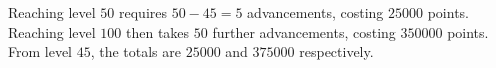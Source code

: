 Reaching level $50$ requires $50-45=5$ advancements, costing $25000$ points. Reaching level $100$ then takes $50$ further advancements, costing $350000$ points. From level $45$, the totals are $\boxed{25000}$ and $\boxed{375000}$ respectively.
